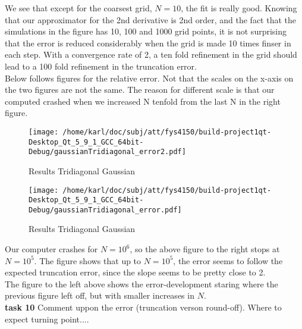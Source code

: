 \documentclass{article}
\begin{document}
We see that except for the coarsest grid, $N=10$, the fit is really good. Knowing that our approximator for the 2nd derivative is 2nd order, and the fact that the simulations in the figure has 10, 100 and 1000 grid points, it is not surprising that the error is reduced considerably when the grid is made 10 times finser in each step. With a convergence rate of 2, a ten fold refinement in the grid should lead to a 100 fold refinement in the truncation error.\\

Below follows figures for the relative error. Not that the scales on the x-axis on the two figures are not the same. The reason for different scale is that our computed crashed when we increased N tenfold from the last N in the right figure.\\


\begin{minipage}{.49\textwidth} %
\begin{figure}[H]
	\centering
	\texttt{[image: /home/karl/doc/subj/att/fys4150/build-project1qt-Desktop\_Qt\_5\_9\_1\_GCC\_64bit-Debug/gaussianTridiagonal\_error2.pdf]}
	\caption{Results Tridiagonal Gaussian}
	\label{1}
\end{figure}
\end{minipage}\hfill
\begin{minipage}{.49\textwidth}
\begin{figure}[H]
	\centering
	\texttt{[image: /home/karl/doc/subj/att/fys4150/build-project1qt-Desktop\_Qt\_5\_9\_1\_GCC\_64bit-Debug/gaussianTridiagonal\_error.pdf]}
	\caption{Results Tridiagonal Gaussian}
	\label{1}
\end{figure}

\end{minipage}\hfill

Our computer crashes for $N = 10^6$, so the above figure to the right stops at $N = 10^5$. The figure shows that up to $N = 10^5$, the error seems to follow the expected truncation error, since the slope seems to be pretty close to 2.\\

The figure to the left above shows the error-development staring where the previous figure left off, but with smaller increases in $N$.\\

\textbf{task 10} Comment uppon the error (truncation verson round-off). Where to expect turning point....
\end{document}
